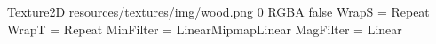 Texture2D
resources/textures/img/wood.png
0
RGBA
false
WrapS = Repeat
WrapT = Repeat
MinFilter = LinearMipmapLinear
MagFilter = Linear
